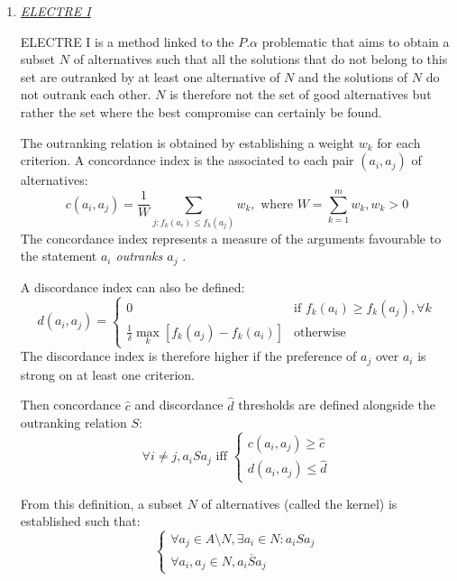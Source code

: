 \begin{enumerate}
\item \textit{\underline{ELECTRE I}}

ELECTRE I is a method linked to the $P.\alpha$ problematic that aims to obtain a subset $N$ of alternatives such that all the solutions that do not belong to this set are outranked by at least one alternative of $N$ and the solutions of $N$ do not outrank each other. $N$ is therefore not the set of good alternatives but rather the set where the best compromise can certainly be found.

The outranking relation is obtained by establishing a weight $w_k$ for each criterion. A concordance index is the associated to each pair $(a_i, a_j)$ of alternatives:
\begin{equation}
c(a_i, a_j) = \frac{1}{W} \sum_{j:f_{k}(a_i) \leq f_{k}(a_j)}{w_{k}}, \text{ where } W = \sum_{k=1}^{m} w_{k}, w_k > 0
\end{equation}
The concordance index represents a measure of the arguments favourable to the statement \og \textit{$a_i$ outranks $a_j$} \fg.

A discordance index can also be defined:
\begin{equation}
d(a_i, a_j) = \begin{cases}
	0& \text{if $f_{k}(a_i) \geq f_{k}(a_j), \forall k$}\\
	\frac{1}{\delta} \max_{k} [f_{k}(a_j) - f_{k}(a_i)]& \text{otherwise}
	\end{cases}
\end{equation}
The discordance index is therefore higher if the preference of $a_j$ over $a_i$ is strong on at least one criterion.

Then concordance $\hat{c}$ and discordance $\hat{d}$ thresholds are defined alongside the outranking relation $S$:
\begin{equation}
\forall i \neq j, a_iSa_j \text{ iff } \begin{cases}
	c(a_i, a_j) \geq \hat{c}\\
	d(a_i, a_j) \leq \hat{d}
	\end{cases}
\end{equation}

From this definition, a subset $N$ of alternatives (called the kernel) is established such that:
\begin{equation}
\begin {cases}
\forall a_j \in A\setminus N, \exists a_i \in N : a_iSa_j\\
\forall a_i, a_j \in N, a_i \overline{S} a_j
\end{cases}
\end{equation}


\end{enumerate}
